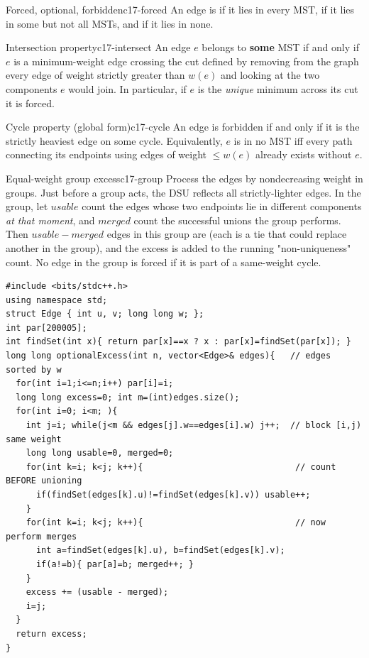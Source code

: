\begin{definition}{Forced, optional, forbidden}{c17-forced}
An edge is  if it lies in every MST,  if it lies in
some but not all MSTs, and  if it lies in none.
\end{definition}

\begin{theorem}{Intersection property}{c17-intersect}
An edge \(e\) belongs to \textbf{some} MST if and only if \(e\) is a minimum-weight
edge crossing the cut defined by removing from the graph every edge of weight
strictly greater than \(w(e)\) and looking at the two components \(e\) would join.
In particular, if \(e\) is the \emph{unique} minimum across its cut it is forced.
\end{theorem}

\begin{theorem}{Cycle property (global form)}{c17-cycle}
An edge is forbidden if and only if it is the strictly heaviest edge on some
cycle.  Equivalently, \(e\) is in no MST iff every path connecting its endpoints
using edges of weight \(\le w(e)\) already exists without \(e\).
\end{theorem}

\begin{lemma}{Equal-weight group excess}{c17-group}
Process the edges by nondecreasing weight in groups.  Just before a group acts,
the DSU reflects all strictly-lighter edges.  In the group, let \(\mathit{usable}\)
count the edges whose two endpoints lie in different components \emph{at that
moment}, and \(\mathit{merged}\) count the successful unions the group performs.
Then \(\mathit{usable}-\mathit{merged}\) edges in this group are 
(each is a tie that could replace another in the group), and the excess is added
to the running "non-uniqueness" count.  No edge in the group is forced if it is
part of a same-weight cycle.
\end{lemma}

\begin{lstlisting}[caption={Per-group Kruskal that returns the total optional-excess sum. Edges are pre-sorted; each maximal equal-weight block is scanned twice: once to count usable edges against the pre-group DSU, once to perform the merges}, label={lst:c17-group}]
#include <bits/stdc++.h>
using namespace std;
struct Edge { int u, v; long long w; };
int par[200005];
int findSet(int x){ return par[x]==x ? x : par[x]=findSet(par[x]); }
long long optionalExcess(int n, vector<Edge>& edges){   // edges sorted by w
  for(int i=1;i<=n;i++) par[i]=i;
  long long excess=0; int m=(int)edges.size();
  for(int i=0; i<m; ){
    int j=i; while(j<m && edges[j].w==edges[i].w) j++;  // block [i,j) same weight
    long long usable=0, merged=0;
    for(int k=i; k<j; k++){                              // count BEFORE unioning
      if(findSet(edges[k].u)!=findSet(edges[k].v)) usable++;
    }
    for(int k=i; k<j; k++){                              // now perform merges
      int a=findSet(edges[k].u), b=findSet(edges[k].v);
      if(a!=b){ par[a]=b; merged++; }
    }
    excess += (usable - merged);
    i=j;
  }
  return excess;
}
\end{lstlisting}

